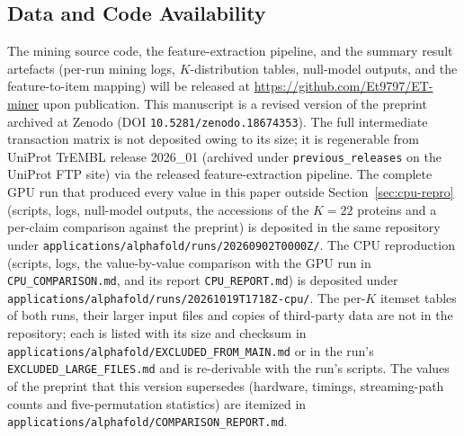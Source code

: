 \documentclass[10pt,a4paper,twocolumn]{article}
\begin{document}
\subsection*{Data and Code Availability}
\small
\noindent The mining source code, the feature-extraction pipeline, and the summary result artefacts (per-run mining logs, $K$-distribution tables, null-model outputs, and the feature-to-item mapping) will be released at \url{https://github.com/Et9797/ET-miner} upon publication. This manuscript is a revised version of the preprint archived at Zenodo (DOI \texttt{10.5281/zenodo.18674353}). The full intermediate transaction matrix is not deposited owing to its size; it is regenerable from UniProt TrEMBL release 2026\_01 (archived under \texttt{previous\_releases} on the UniProt FTP site) via the released feature-extraction pipeline. The complete GPU run that produced every value in this paper outside Section~\ref{sec:cpu-repro} (scripts, logs, null-model outputs, the accessions of the $K{=}22$ proteins and a per-claim comparison against the preprint) is deposited in the same repository under \texttt{applications/alphafold/runs/20260902T0000Z/}. The CPU reproduction (scripts, logs, the value-by-value comparison with the GPU run in \texttt{CPU\_COMPARISON.md}, and its report \texttt{CPU\_REPORT.md}) is deposited under \texttt{applications/alphafold/runs/20261019T1718Z-cpu/}. The per-$K$ itemset tables of both runs, their larger input files and copies of third-party data are not in the repository; each is listed with its size and checksum in \texttt{applications/alphafold/EXCLUDED\_FROM\_MAIN.md} or in the run's \texttt{EXCLUDED\_LARGE\_FILES.md} and is re-derivable with the run's scripts. The values of the preprint that this version supersedes (hardware, timings, streaming-path counts and five-permutation statistics) are itemized in \texttt{applications/alphafold/COMPARISON\_REPORT.md}.
\normalsize

\end{document}
